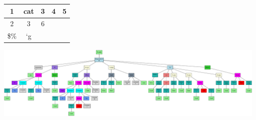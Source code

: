 \documentclass{article}
\begin{document}
\begin{table}[]
\centering
\begin{tabular}{|c|c|c|c|c}
\hline
1 & cat & 3 & 4 & 5 \\ 
\hline
2 & 3 & 6 &  &  \\ 
\hline
\$\% & `g &  &  &  \\ 
\hline
\end{tabular}
\end{table}
\includegraphics[width=\textwidth]{artifacts/ast_tree.png}
\end{document}

